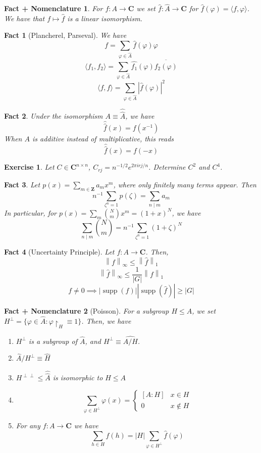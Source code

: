 \documentclass[12pt]{article}
\newtheorem*{fact*}{Fact}
\newtheorem*{fact_plus_nomn*}{Fact + Nomenclature}
\newtheorem*{exer*}{Exercise}
\newcommand{\abs}[1]{\left\lvert#1\right\rvert}
\newcommand{\gen}[1]{\langle#1\rangle}
\newcommand{\norm}[1]{\left\lVert#1\right\rVert}
\DeclareMathOperator{\supp}{supp}
\newcommand{\too}{\longrightarrow}
\newcommand{\vphi}{\varphi}
\newcommand{\C}{\mathbf{C}}
\newcommand{\Z}{\mathbf{Z}}
\begin{document}
\begin{fact_plus_nomn*}
For $f : A\too \C$ we set $\hat{f} : \hat{A} \too \C$ for $\hat{f}(\vphi) = \gen{f,\vphi}$. We have that $f\mapsto\hat{f}$ is a linear isomorphism.
\end{fact_plus_nomn*}


\begin{fact*}[Plancherel, Parseval]
We have 
\[ f = \sum_{\vphi\in\hat{A}} \hat{f}(\vphi)\vphi\]
\[\gen{f_1,f_2} = \sum_{\vphi\in\hat{A}}\hat{f_1}(\vphi)\overline{\hat{f_2}(\vphi)}\]
\[\gen{f,f} = \sum_{\vphi\in\hat{A}}\abs{\hat{f}(\vphi)}^2\]
\end{fact*}


\begin{fact*}
Under the isomorphism $A\equiv \hat{\hat{A}}$, we have \[\hat{\hat{f}}(x)=f(x^{-1})\]
When $A$ is additive instead of multiplicative, this reads
\[\hat{\hat{f}}(x)=f(-x)\]
\end{fact*}


\begin{exer*}
Let $C\in\C^{n\times n}$, $C_{rj} = n^{-1/2}e^{2\pi i rj/n}$. Determine $C^2$ and $C^4$.
\end{exer*}


\begin{fact*}
Let $p(x) = \sum_{m\in\Z} a_mx^m$, where only finitely many terms appear. Then \[n^{-1}\sum_{\zeta^n=1}p(\zeta) = \sum_{n\mid m}a_m\]
In particular, for $p(x)=\sum_m \binom{N}{m}x^m = (1+x)^N$, we have
\[\sum_{n\mid m}\binom{N}{m}= n^{-1}\sum_{\zeta^n=1}(1+\zeta)^N\]
\end{fact*}


\begin{fact*}[Uncertainty Principle]
Let $f:A\to\C$. Then, 
\[\norm{f}_\infty \le \norm{\hat{f}}_1\]
\[\norm{\hat{f}}_\infty \le \frac{1}{\abs{G}}\norm{f}_1\]
\[f\neq 0 \implies \abs{\supp(f)} \abs{\supp(\hat{f})} \ge \abs{G}\]
\end{fact*}


\begin{fact_plus_nomn*}[Poisson]
For a subgroup $H\le A$, we set $H^\perp = \{\vphi\in\hat{A} : \vphi\restriction_H \equiv 1\}$. Then, we have
\begin{enumerate}
    \item $H^\perp$ is a subgroup of $\hat{A}$, and $H^\perp \equiv \widehat{A/H}$.
    \item $\hat{A}/H^\perp \equiv \hat{H}$
    \item $H^{\perp\perp} \le \hat{\hat{A}}$ is isomorphic to $H\le A$
    \item \[\sum_{\vphi\in H^\perp}\vphi(x) = \begin{cases}
        [A:H] & x\in H\\
        0 & x\not\in H
    \end{cases}\]
    \item For any $f:A\to\C$ we have \[\sum_{h\in H}f(h) = \abs{H} \sum_{\vphi\in H^\perp} \hat{f}(\vphi)\]
\end{enumerate}
\end{fact_plus_nomn*}
\end{document}
